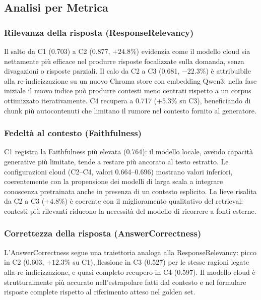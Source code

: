 \documentclass[11pt,a4paper]{article}
\begin{document}
\subsection{Analisi per Metrica}
\label{subsec:per_metric}

\subsubsection{Rilevanza della risposta (ResponseRelevancy)}

Il salto da C1 (0.703) a C2 (0.877, $+24.8\%$) evidenzia come il modello cloud
sia nettamente più efficace nel produrre risposte focalizzate sulla domanda, senza
divagazioni o risposte parziali. Il calo da C2 a C3 (0.681, $-22.3\%$) è attribuibile
alla re-indicizzazione su un nuovo Chroma store con embedding Qwen3: nella fase
iniziale il nuovo indice può produrre contesti meno centrati rispetto a un corpus
ottimizzato iterativamente. C4 recupera a 0.717 ($+5.3\%$ su C3), beneficiando
di chunk più autocontenuti che limitano il rumore nel contesto fornito al generatore.

\subsubsection{Fedeltà al contesto (Faithfulness)}

C1 registra la Faithfulness più elevata (0.764): il modello locale, avendo capacità
generative più limitate, tende a restare più ancorato al testo estratto. Le
configurazioni cloud (C2--C4, valori 0.664--0.696) mostrano valori inferiori,
coerentemente con la propensione dei modelli di larga scala a integrare conoscenza
pretrainata anche in presenza di un contesto esplicito. La lieve risalita da C2 a
C3 ($+4.8\%$) è coerente con il miglioramento qualitativo del retrieval: contesti
più rilevanti riducono la necessità del modello di ricorrere a fonti esterne.

\subsubsection{Correttezza della risposta (AnswerCorrectness)}

L'AnswerCorrectness segue una traiettoria analoga alla ResponseRelevancy: picco in
C2 (0.603, $+12.3\%$ su C1), flessione in C3 (0.527) per le stesse ragioni legate
alla re-indicizzazione, e quasi completo recupero in C4 (0.597). Il modello cloud
è strutturalmente più accurato nell'estrapolare fatti dal contesto e nel formulare
risposte complete rispetto al riferimento atteso nel golden set.
\end{document}
